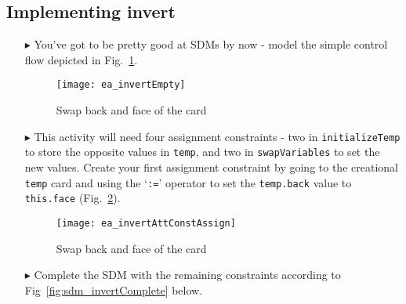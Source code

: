 \newpage
\hypertarget{invertCard vis}{}
\subsection{Implementing invert}
\visHeader

\begin{itemize}

\vspace{0.5cm}

\item[$\blacktriangleright$] You've got to be pretty good at SDMs by now - model the simple control flow depicted in Fig.~\ref{fig:sdm_invertEmpty}. 

\vspace{0.5cm}

\begin{figure}[htbp]
\begin{center}
  \texttt{[image: ea\_invertEmpty]}
  \caption{Swap back and face of the card}  
  \label{fig:sdm_invertEmpty}
\end{center}
\end{figure}

\vspace{0.5cm}

\item[$\blacktriangleright$] This activity will need four assignment constraints - two in \texttt{initializeTemp} to store the opposite values in
\texttt{temp}, and two in \texttt{swapVariables} to set the new values. Create your first assignment constraint by going to the creational \texttt{temp} card
and using the `\texttt{:=}' operator to set the \texttt{temp.back} value to \texttt{this.face} (Fig.~\ref{fig:sdm_invertAssignment}).

\begin{figure}[htbp]
\begin{center}
  \texttt{[image: ea\_invertAttConstAssign]}
  \caption{Swap back and face of the card}  
  \label{fig:sdm_invertAssignment}
\end{center}
\end{figure}

\clearpage

\vspace*{0.5cm}

\item[$\blacktriangleright$] Complete the SDM with the remaining constraints according to Fig~\ref{fig:sdm_invertComplete} below.

\vspace{0.5cm}


\end{itemize}
